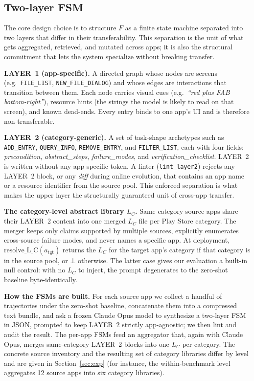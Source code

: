 \subsection{Two-layer FSM}
\label{sec:method-fsm}

The core design choice is to structure $F$ as a finite state machine separated
into two layers that differ in their transferability. This separation is the
unit of what gets aggregated, retrieved, and mutated across apps; it is also the
structural commitment that lets the system specialize without breaking transfer.

\textbf{LAYER~1 (app-specific).} A directed graph whose nodes are screens (e.g.\
\texttt{FILE\_LIST}, \texttt{NEW\_FILE\_DIALOG}) and whose edges are interactions
that transition between them. Each node carries visual cues (e.g.\ \emph{``red
plus FAB bottom-right''}), resource hints (the strings the model is likely to
read on that screen), and known dead-ends. Every entry binds to one app's UI and
is therefore non-transferable.

\textbf{LAYER~2 (category-generic).} A set of task-shape archetypes such as
\texttt{ADD\_ENTRY}, \texttt{QUERY\_INFO}, \texttt{REMOVE\_ENTRY}, and
\texttt{FILTER\_LIST}, each with four fields: \emph{precondition},
\emph{abstract\_steps}, \emph{failure\_modes}, and
\emph{verification\_checklist}. LAYER~2 is written without any app-specific
token. A linter (\texttt{lint\_layer2}) rejects any LAYER~2 block, or any
\emph{diff} during online evolution, that contains an app name or a resource
identifier from the source pool. This enforced separation is what makes the
upper layer the structurally guaranteed unit of cross-app transfer.

\textbf{The category-level abstract library $L_C$.} Same-category source apps
share their LAYER~2 content into one merged $L_C$ file per Play Store category.
The merger keeps only claims supported by multiple sources, explicitly
enumerates cross-source failure modes, and never names a specific app. At
deployment, $\mathrm{resolve\_L\_C}(a_{\text{tgt}})$ returns the $L_C$ for the
target app's category if that category is in the source pool, or $\bot$
otherwise. The latter case gives our evaluation a built-in null control: with no
$L_C$ to inject, the prompt degenerates to the zero-shot baseline
byte-identically.

\textbf{How the FSMs are built.} For each source app we collect a handful of
trajectories under the zero-shot baseline, concatenate them into a compressed
text bundle, and ask a frozen Claude Opus model to synthesize a two-layer FSM in
JSON, prompted to keep LAYER~2 strictly app-agnostic; we then lint and audit the
result. The per-app FSMs feed an aggregator that, again with Claude Opus, merges
same-category LAYER~2 blocks into one $L_C$ per category. The concrete source
inventory and the resulting set of category libraries differ by level and are
given in Section~\ref{sec:exp} (for instance, the within-benchmark level
aggregates 12 source apps into six category libraries).

